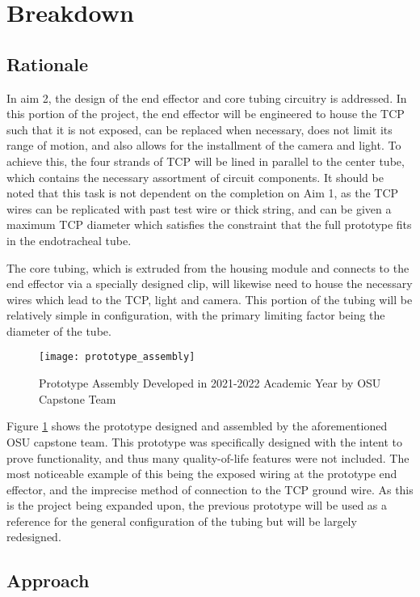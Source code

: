 \section{Breakdown}

\subsection{Rationale}

	In aim 2, the design of the end effector and core tubing circuitry is addressed. In this portion of the project, the end effector will be engineered to house the TCP such that it is not exposed, can be replaced when necessary, does not limit its range of motion, and also allows for the installment of the camera and light. To achieve this, the four strands of TCP will be lined in parallel to the center tube, which contains the necessary assortment of circuit components. It should be noted that this task is not dependent on the completion on Aim 1, as the TCP wires can be replicated with past test wire or thick string, and can be given a maximum TCP diameter which satisfies the constraint that the full prototype fits in the endotracheal tube.

	The core tubing, which is extruded from the housing module and connects to the end effector via a specially designed clip, will likewise need to house the necessary wires which lead to the TCP, light and camera. This portion of the tubing will be relatively simple in configuration, with the primary limiting factor being the diameter of the tube.

	\begin{figure}[ht]
		\centering
		\texttt{[image: prototype\_assembly]}
		\caption{Prototype Assembly Developed in 2021-2022 Academic Year by OSU Capstone Team}
		\label{fig:prototype_assembly}
	\end{figure}
	
	Figure \ref{fig:prototype_assembly} shows the prototype designed and assembled by the aforementioned OSU capstone team. This prototype was specifically designed with the intent to prove functionality, and thus many quality-of-life features were not included. The most noticeable example of this being the exposed wiring at the prototype end effector, and the imprecise method of connection to the TCP ground wire. As this is the project being expanded upon, the previous prototype will be used as a reference for the general configuration of the tubing but will be largely redesigned.

\subsection{Approach}

